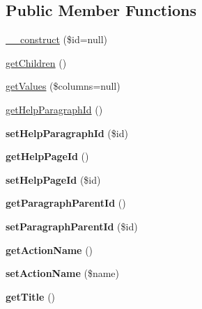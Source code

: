 \subsection*{Public Member Functions}
\begin{DoxyCompactItemize}
\item 
\hyperlink{classHelpParagraph_a1f77bc76e254790960abd99764d788f7}{\_\-\_\-construct} (\$id=null)
\item 
\hyperlink{classHelpParagraph_ad8f5fd9b0e40916b137f63ba014b51f7}{getChildren} ()
\item 
\hyperlink{classHelpParagraph_ab86c3034d2e3c9178c83abbc3eca8ee3}{getValues} (\$columns=null)
\item 
\hyperlink{classHelpParagraph_a45d0b320057f827f2a0803822bd963ec}{getHelpParagraphId} ()
\item 
\hypertarget{classHelpParagraph_a5d4347d4986b540ec1375f076e3c3e64}{
{\bfseries setHelpParagraphId} (\$id)}
\label{classHelpParagraph_a5d4347d4986b540ec1375f076e3c3e64}

\item 
\hypertarget{classHelpParagraph_a28d6e0c12c8c38f9a70c79ecee2969ff}{
{\bfseries getHelpPageId} ()}
\label{classHelpParagraph_a28d6e0c12c8c38f9a70c79ecee2969ff}

\item 
\hypertarget{classHelpParagraph_a412f3c69319be42d4fe6adc86c799011}{
{\bfseries setHelpPageId} (\$id)}
\label{classHelpParagraph_a412f3c69319be42d4fe6adc86c799011}

\item 
\hypertarget{classHelpParagraph_acd30abd4fe91fbd1af0c6071794172ea}{
{\bfseries getParagraphParentId} ()}
\label{classHelpParagraph_acd30abd4fe91fbd1af0c6071794172ea}

\item 
\hypertarget{classHelpParagraph_a1f3537f2b191ed43f2961e760fb0423b}{
{\bfseries setParagraphParentId} (\$id)}
\label{classHelpParagraph_a1f3537f2b191ed43f2961e760fb0423b}

\item 
\hypertarget{classHelpParagraph_a8f6e8ce47bb87089a5f6f772d6e1e0f8}{
{\bfseries getActionName} ()}
\label{classHelpParagraph_a8f6e8ce47bb87089a5f6f772d6e1e0f8}

\item 
\hypertarget{classHelpParagraph_a65a6f8272945f34160da6be22639e26d}{
{\bfseries setActionName} (\$name)}
\label{classHelpParagraph_a65a6f8272945f34160da6be22639e26d}

\item 
\hypertarget{classHelpParagraph_af133187c01a1d3774c52fe057c850556}{
{\bfseries getTitle} ()}
\label{classHelpParagraph_af133187c01a1d3774c52fe057c850556}


\end{DoxyCompactItemize}
